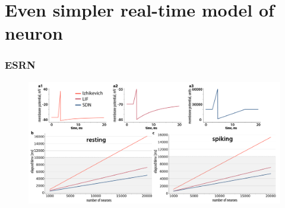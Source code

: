 \documentclass[12pt, aspectratio=169]{beamer}
\begin{document}

\section{Even simpler real-time model of neuron}
\begin{frame}
  \frametitle{ESRN}
  \begin{figure}
    \includegraphics[width=0.8\linewidth]{states}
  \end{figure}
\end{frame}
\end{document}

